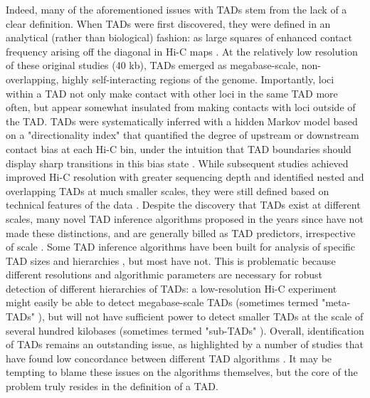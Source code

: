 Indeed, many of the aforementioned issues with TADs stem from the lack of a clear definition. When TADs were first discovered, they were defined in an analytical (rather than biological) fashion: as large squares of enhanced contact frequency arising off the diagonal in Hi-C maps \cite{Dixon.2012, Nora.2012, Hou.2012, Sexton.2012}. At the relatively low resolution of these original studies (40 kb), TADs emerged as megabase-scale, non-overlapping, highly self-interacting regions of the genome. Importantly, loci within a TAD not only make contact with other loci in the same TAD more often, but appear somewhat insulated from making contacts with loci outside of the TAD. TADs were systematically inferred with a hidden Markov model based on a "directionality index" that quantified the degree of upstream or downstream contact bias at each Hi-C bin, under the intuition that TAD boundaries should display sharp transitions in this bias state \cite{Dixon.2012}. While subsequent studies achieved improved Hi-C resolution with greater sequencing depth and identified nested and overlapping TADs at much smaller scales, they were still defined based on technical features of the data \cite{Rao.2014}. Despite the discovery that TADs exist at different scales, many novel TAD inference algorithms proposed in the years since have not made these distinctions, and are generally billed as TAD predictors, irrespective of scale \cite{Dali.2017}. Some TAD inference algorithms have been built for analysis of specific TAD sizes and hierarchies \cite{Rao.2014, Weinreb.2016}, but most have not. This is problematic because different resolutions and algorithmic parameters are necessary for robust detection of different hierarchies of TADs: a low-resolution Hi-C experiment might easily be able to detect megabase-scale TADs (sometimes termed "meta-TADs" \cite{Fraser.2015a}), but will not have sufficient power to detect smaller TADs at the scale of several hundred kilobases (sometimes termed "sub-TADs" \cite{Phillips-Cremins.2013}). Overall, identification of TADs remains an outstanding issue, as highlighted by a number of studies that have found low concordance between different TAD algorithms \cite{Dali.2017, Zufferey.2018, Forcato.2017}. It may be tempting to blame these issues on the algorithms themselves, but the core of the problem truly resides in the definition of a TAD.


